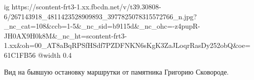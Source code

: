  
 
 
 
 

\ifcmt
  ig https://scontent-frt3-1.xx.fbcdn.net/v/t39.30808-6/267143918_4811423528909893_3977825078315572766_n.jpg?_nc_cat=108&ccb=1-5&_nc_sid=b9115d&_nc_ohc=-z4pupR-JH0AX9H0k8M&_nc_ht=scontent-frt3-1.xx&oh=00_AT8aBqRPSfHSdf7PZDFNKN6sKgK3ZaJLoqrRasDy252obQ&oe=61C1FB56
  @width 0.4
\fi


Вид на бывшую остановку маршрутки от памятника Григорию Сковороде.
